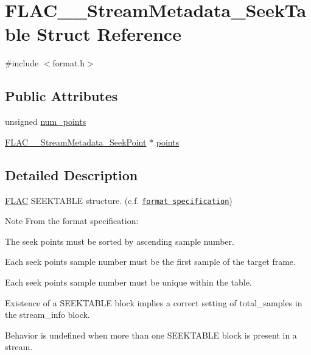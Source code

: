 \hypertarget{struct_f_l_a_c_____stream_metadata___seek_table}{}\section{F\+L\+A\+C\+\_\+\+\_\+\+Stream\+Metadata\+\_\+\+Seek\+Table Struct Reference}
\label{struct_f_l_a_c_____stream_metadata___seek_table}


{\ttfamily \#include $<$format.\+h$>$}

\subsection*{Public Attributes}
\begin{DoxyCompactItemize}
\item 
unsigned \hyperlink{struct_f_l_a_c_____stream_metadata___seek_table_a12dcdb596297c199fe6cffa27a64e69f}{num\+\_\+points}
\item 
\hyperlink{struct_f_l_a_c_____stream_metadata___seek_point}{F\+L\+A\+C\+\_\+\+\_\+\+Stream\+Metadata\+\_\+\+Seek\+Point} $\ast$ \hyperlink{struct_f_l_a_c_____stream_metadata___seek_table_a0bf04ada03ea708dba9d31cd6c6159b8}{points}
\end{DoxyCompactItemize}


\subsection{Detailed Description}
\hyperlink{namespace_f_l_a_c}{F\+L\+AC} S\+E\+E\+K\+T\+A\+B\+LE structure. (c.\+f. \href{../format.html#metadata_block_seektable}{\tt format specification})

\begin{DoxyNote}{Note}
From the format specification\+:
\begin{DoxyItemize}
\item The seek points must be sorted by ascending sample number.
\item Each seek point\textquotesingle{}s sample number must be the first sample of the target frame.
\item Each seek point\textquotesingle{}s sample number must be unique within the table.
\item Existence of a S\+E\+E\+K\+T\+A\+B\+LE block implies a correct setting of total\+\_\+samples in the stream\+\_\+info block.
\item Behavior is undefined when more than one S\+E\+E\+K\+T\+A\+B\+LE block is present in a stream. 
\end{DoxyItemize}
\end{DoxyNote}


